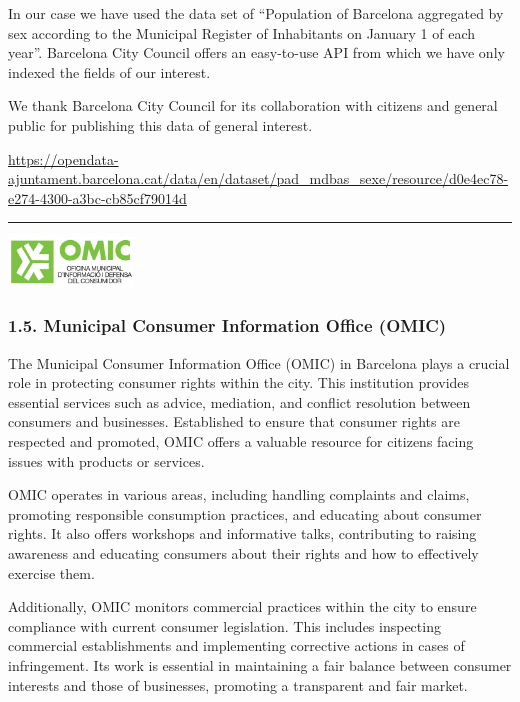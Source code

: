 \documentclass[
]{article}
\begin{document}
In our case we have used the data set of ``Population of Barcelona
aggregated by sex according to the Municipal Register of Inhabitants on
January 1 of each year''. Barcelona City Council offers an easy-to-use
API from which we have only indexed the fields of our interest.

We thank Barcelona City Council for its collaboration with citizens and
general public for publishing this data of general interest.

\url{https://opendata-ajuntament.barcelona.cat/data/en/dataset/pad_mdbas_sexe/resource/d0e4ec78-e274-4300-a3bc-cb85cf79014d}

\begin{center}\rule{0.5\linewidth}{0.5pt}\end{center}

\includegraphics[width=0.25\textwidth,height=\textheight]{Assets/OMIC.png}

\hypertarget{municipal-consumer-information-office-omic}{%
\subsubsection{1.5. Municipal Consumer Information Office
(OMIC)}\label{municipal-consumer-information-office-omic}}

The Municipal Consumer Information Office (OMIC) in Barcelona plays a
crucial role in protecting consumer rights within the city. This
institution provides essential services such as advice, mediation, and
conflict resolution between consumers and businesses. Established to
ensure that consumer rights are respected and promoted, OMIC offers a
valuable resource for citizens facing issues with products or services.

OMIC operates in various areas, including handling complaints and
claims, promoting responsible consumption practices, and educating about
consumer rights. It also offers workshops and informative talks,
contributing to raising awareness and educating consumers about their
rights and how to effectively exercise them.

Additionally, OMIC monitors commercial practices within the city to
ensure compliance with current consumer legislation. This includes
inspecting commercial establishments and implementing corrective actions
in cases of infringement. Its work is essential in maintaining a fair
balance between consumer interests and those of businesses, promoting a
transparent and fair market.
\end{document}
